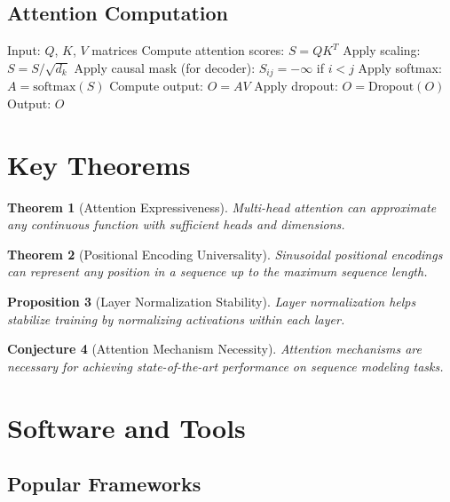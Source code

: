 \documentclass[11pt,a4paper]{article}
\newtheorem{theorem}{Theorem}[section]
\newtheorem{proposition}[theorem]{Proposition}
\newtheorem{conjecture}[theorem]{Conjecture}
\begin{document}
\subsection{Attention Computation}

\begin{algorithm}
\caption{Efficient Attention Computation}
\begin{algorithmic}[1]
\STATE Input: $Q$, $K$, $V$ matrices
\STATE Compute attention scores: $S = QK^T$
\STATE Apply scaling: $S = S / \sqrt{d_k}$
\STATE Apply causal mask (for decoder): $S_{ij} = -\infty$ if $i < j$
\STATE Apply softmax: $A = \text{softmax}(S)$
\STATE Compute output: $O = AV$
\STATE Apply dropout: $O = \text{Dropout}(O)$
\STATE Output: $O$
\end{algorithmic}
\end{algorithm}

\section{Key Theorems}

\begin{theorem}[Attention Expressiveness]
Multi-head attention can approximate any continuous function with sufficient heads and dimensions.
\end{theorem}

\begin{theorem}[Positional Encoding Universality]
Sinusoidal positional encodings can represent any position in a sequence up to the maximum sequence length.
\end{theorem}

\begin{proposition}[Layer Normalization Stability]
Layer normalization helps stabilize training by normalizing activations within each layer.
\end{proposition}

\begin{conjecture}[Attention Mechanism Necessity]
Attention mechanisms are necessary for achieving state-of-the-art performance on sequence modeling tasks.
\end{conjecture}

\section{Software and Tools}

\subsection{Popular Frameworks}
\end{document}
